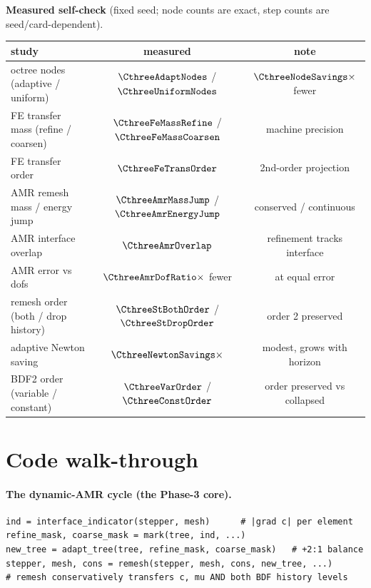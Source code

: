 \begin{keybox}
\textbf{Measured self-check} (fixed seed; node counts are exact, step
counts are seed/card-dependent).
\begin{center}\small
\begin{tabular}{lcc}
\toprule
study & measured & note \\
\midrule
octree nodes (adaptive / uniform) & $\CthreeAdaptNodes$ / $\CthreeUniformNodes$ & $\CthreeNodeSavings\times$ fewer \\
FE transfer mass (refine / coarsen) & $\CthreeFeMassRefine$ / $\CthreeFeMassCoarsen$ & machine precision \\
FE transfer order & $\CthreeFeTransOrder$ & 2nd-order projection \\
AMR remesh mass / energy jump & $\CthreeAmrMassJump$ / $\CthreeAmrEnergyJump$ & conserved / continuous \\
AMR interface overlap & $\CthreeAmrOverlap$ & refinement tracks interface \\
AMR error vs dofs & $\CthreeAmrDofRatio\times$ fewer & at equal error \\
remesh order (both / drop history) & $\CthreeStBothOrder$ / $\CthreeStDropOrder$ & order 2 preserved \\
adaptive Newton saving & $\CthreeNewtonSavings\times$ & modest, grows with horizon \\
BDF2 order (variable / constant) & $\CthreeVarOrder$ / $\CthreeConstOrder$ & order preserved vs collapsed \\
\bottomrule
\end{tabular}
\end{center}
\end{keybox}

\section{Code walk-through}

\paragraph{The dynamic-AMR cycle (the Phase-3 core).}
\begin{lstlisting}
ind = interface_indicator(stepper, mesh)      # |grad c| per element
refine_mask, coarse_mask = mark(tree, ind, ...)
new_tree = adapt_tree(tree, refine_mask, coarse_mask)   # +2:1 balance
stepper, mesh, cons = remesh(stepper, mesh, cons, new_tree, ...)
# remesh conservatively transfers c, mu AND both BDF history levels
\end{lstlisting}


